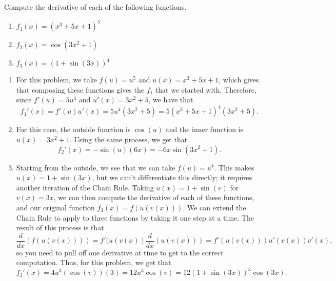 \documentclass{ximera}
\begin{document}
\begin{example}
    Compute the derivative of each of the following functions.
    \begin{enumerate}
        \item $f_1(x) = (x^3 + 5x + 1)^5$
        \item $f_2(x) = \cos(3x^2 + 1)$
        \item $f_3(x) = (1 + \sin(3x))^4$
    \end{enumerate}
\end{example}
\begin{exampleSol}
    \begin{enumerate}
        \item For this problem, we take $f(u) = u^5$ and $u(x) = x^3 + 5x + 1$, which gives that composing these functions gives the $f_1$ that we started with. Therefore, since $f'(u) = 5u^4$ and $u'(x) = 3x^2 + 5$, we have that
        \[ 
            f_1'(x) = f'(u)u'(x) = 5u^4(3x^2 + 5) = 5(x^3 + 5x + 1)^4(3x^2 + 5). 
        \]
        
        \item For this case, the outside function is $\cos(u)$ and the inner function is $u(x) = 3x^2 + 1$. Using the same process, we get that
        \[ 
            f_2'(x) = -\sin(u)(6x) = -6x\sin(3x^2 + 1).
        \]
        
        \item Starting from the outside, we see that we can take $f(u) = u^4$. This makes $u(x) = 1 + \sin(3x)$, but we can't differentiate this directly; it requires another iteration of the Chain Rule. Taking $u(x) = 1 + \sin(v)$ for $v(x) = 3x$, we can then compute the derivative of each of these functions, and our original function $f_3(x) = f(u(v(x)))$. We can extend the Chain Rule to apply to three functions by taking it one step at a time. The result of this process is that
            \[ 
                \frac{d}{dx}(f(u(v(x)))) = f'(u(v(x))\frac{d}{dx}(u(v(x))) = f'(u(v(x)))u'(v(x))v'(x),
            \] 
            so you need to pull off one derivative at time to get to the correct computation. Thus, for this problem, we get that
            \[ 
                f_3'(x) = 4u^3(\cos(v))(3) = 12u^3\cos(v) = 12(1 + \sin(3x))^3\cos(3x).
            \]
    \end{enumerate}
\end{exampleSol}

\end{document}
